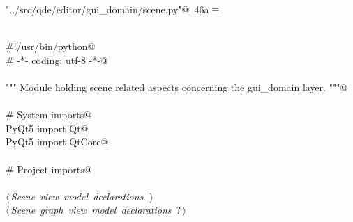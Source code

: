 \documentclass[
    a4paper,      %
    10pt,         %
    openright,    %
    notitlepage,  %
    parskip=half, %
]{scrreprt}       %
\theoremstyle{definition}                    %
\begin{document}
\begin{flushleft} \small
\begin{minipage}{\linewidth}\label{scrap54}\raggedright\small
{} \verb@"../src/qde/editor/gui_domain/scene.py"@\nobreak\ {\footnotesize {46a}}$\equiv$
\vspace{-1ex}
\begin{list}{}{} \item
\mbox{}\lstinline@@\\
\mbox{}\lstinline@#!/usr/bin/python@\\
\mbox{}\lstinline@# -*- coding: utf-8 -*-@\\
\mbox{}\lstinline@@\\
\mbox{}\lstinline@""" Module holding scene related aspects concerning the gui_domain layer. """@\\
\mbox{}\lstinline@@\\
\mbox{}\lstinline@# System imports@\\
\mbox{}\lstinline@from PyQt5 import Qt@\\
\mbox{}\lstinline@from PyQt5 import QtCore@\\
\mbox{}\lstinline@@\\
\mbox{}\lstinline@# Project imports@\\
\mbox{}\lstinline@@\\
\mbox{}\lstinline@@\hbox{$\langle\,${\itshape Scene view model declarations}\nobreak\ {\footnotesize {}}$\,\rangle$}\lstinline@@\\
\mbox{}\lstinline@@\hbox{$\langle\,${\itshape Scene graph view model declarations}\nobreak\ {\footnotesize ?}$\,\rangle$}\lstinline@@\\
\mbox{}\lstinline@@{\NWsep}
\end{list}
\vspace{-1.5ex}
\footnotesize
\begin{list}{}{\setlength{\itemsep}{-\parsep}\setlength{\itemindent}{-\leftmargin}}

\item{}
\end{list}
\end{minipage}\vspace{4ex}
\end{flushleft}
\end{document}
